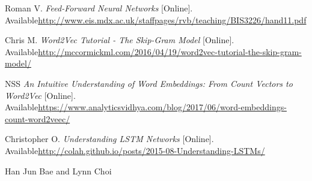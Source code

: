 \begin{thebibliography}{2}
Roman V. \textit{Feed-Forward Neural Networks} [Online]. Available\url{http://www.eis.mdx.ac.uk/staffpages/rvb/teaching/BIS3226/hand11.pdf}

Chris M. \textit{Word2Vec Tutorial - The Skip-Gram Model} [Online]. Available\url{http://mccormickml.com/2016/04/19/word2vec-tutorial-the-skip-gram-model/}

NSS \textit{An Intuitive Understanding of Word Embeddings: From Count Vectors to Word2Vec} [Online]. Available\url{https://www.analyticsvidhya.com/blog/2017/06/word-embeddings-count-word2veec/}

Christopher O. \textit{Understanding LSTM Networks} [Online]. Available\url{http://colah.github.io/posts/2015-08-Understanding-LSTMs/}

Han Jun Bae and Lynn Choi











\end{thebibliography}